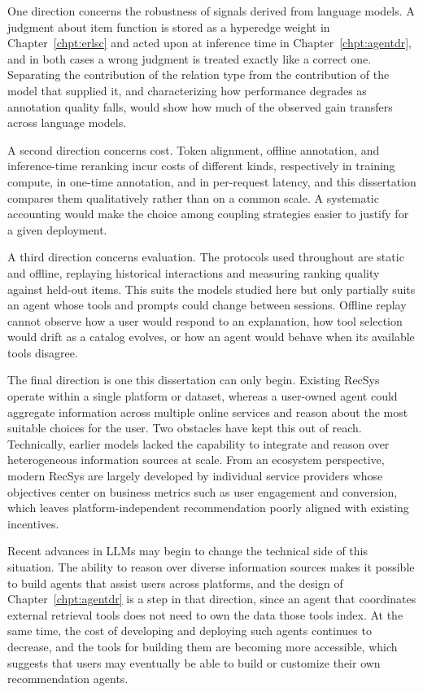 One direction concerns the robustness of signals derived from language models. A judgment about item function is stored as a hyperedge weight in Chapter~\ref{chpt:erlsc} and acted upon at inference time in Chapter~\ref{chpt:agentdr}, and in both cases a wrong judgment is treated exactly like a correct one. Separating the contribution of the relation type from the contribution of the model that supplied it, and characterizing how performance degrades as annotation quality falls, would show how much of the observed gain transfers across language models.

A second direction concerns cost. Token alignment, offline annotation, and inference-time reranking incur costs of different kinds, respectively in training compute, in one-time annotation, and in per-request latency, and this dissertation compares them qualitatively rather than on a common scale. A systematic accounting would make the choice among coupling strategies easier to justify for a given deployment.

A third direction concerns evaluation. The protocols used throughout are static and offline, replaying historical interactions and measuring ranking quality against held-out items. This suits the models studied here but only partially suits an agent whose tools and prompts could change between sessions. Offline replay cannot observe how a user would respond to an explanation, how tool selection would drift as a catalog evolves, or how an agent would behave when its available tools disagree.

The final direction is one this dissertation can only begin. Existing RecSys operate within a single platform or dataset, whereas a user-owned agent could aggregate information across multiple online services and reason about the most suitable choices for the user. Two obstacles have kept this out of reach. Technically, earlier models lacked the capability to integrate and reason over heterogeneous information sources at scale. From an ecosystem perspective, modern RecSys are largely developed by individual service providers whose objectives center on business metrics such as user engagement and conversion, which leaves platform-independent recommendation poorly aligned with existing incentives.

Recent advances in LLMs may begin to change the technical side of this situation. The ability to reason over diverse information sources makes it possible to build agents that assist users across platforms, and the design of Chapter~\ref{chpt:agentdr} is a step in that direction, since an agent that coordinates external retrieval tools does not need to own the data those tools index. At the same time, the cost of developing and deploying such agents continues to decrease, and the tools for building them are becoming more accessible, which suggests that users may eventually be able to build or customize their own recommendation agents.

